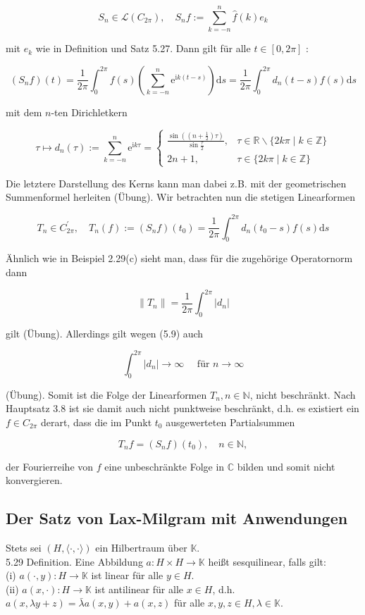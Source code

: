 \documentclass[10pt, letterpaper]{article}
\begin{document}
$$
S_{n} \in \mathcal{L}\left(C_{2 \pi}\right), \quad S_{n} f:=\sum_{k=-n}^{n} \hat{f}(k) e_{k}
$$

mit $e_{k}$ wie in Definition und Satz 5.27. Dann gilt für alle $t \in[0,2 \pi]$ :

$$
\left(S_{n} f\right)(t)=\frac{1}{2 \pi} \int_{0}^{2 \pi} f(s)\left(\sum_{k=-n}^{n} \mathrm{e}^{\mathrm{i} k(t-s)}\right) \mathrm{d} s=\frac{1}{2 \pi} \int_{0}^{2 \pi} d_{n}(t-s) f(s) \mathrm{d} s
$$

mit dem $n$-ten Dirichletkern

$$
\tau \mapsto d_{n}(\tau):=\sum_{k=-n}^{n} \mathrm{e}^{\mathrm{i} k \tau}= \begin{cases}\frac{\sin \left(\left(n+\frac{1}{2}\right) \tau\right)}{\sin \frac{\tau}{2}}, & \tau \in \mathbb{R} \backslash\{2 k \pi \mid k \in \mathbb{Z}\} \\ 2 n+1, & \tau \in\{2 k \pi \mid k \in \mathbb{Z}\}\end{cases}
$$

Die letztere Darstellung des Kerns kann man dabei z.B. mit der geometrischen Summenformel herleiten (Übung). Wir betrachten nun die stetigen Linearformen

$$
T_{n} \in C_{2 \pi}^{\prime}, \quad T_{n}(f):=\left(S_{n} f\right)\left(t_{0}\right)=\frac{1}{2 \pi} \int_{0}^{2 \pi} d_{n}\left(t_{0}-s\right) f(s) \mathrm{d} s
$$

Ähnlich wie in Beispiel 2.29(c) sieht man, dass für die zugehörige Operatornorm dann

$$
\left\|T_{n}\right\|=\frac{1}{2 \pi} \int_{0}^{2 \pi}\left|d_{n}\right|
$$

gilt (Übung). Allerdings gilt wegen (5.9) auch

$$
\int_{0}^{2 \pi}\left|d_{n}\right| \rightarrow \infty \quad \text { für } n \rightarrow \infty
$$

(Übung). Somit ist die Folge der Linearformen $T_{n}, n \in \mathbb{N}$, nicht beschränkt. Nach Hauptsatz 3.8 ist sie damit auch nicht punktweise beschränkt, d.h. es existiert ein $f \in C_{2 \pi}$ derart, dass die im Punkt $t_{0}$ ausgewerteten Partialsummen

$$
T_{n} f=\left(S_{n} f\right)\left(t_{0}\right), \quad n \in \mathbb{N},
$$

der Fourierreihe von $f$ eine unbeschränkte Folge in $\mathbb{C}$ bilden und somit nicht konvergieren.

\subsection*{Der Satz von Lax-Milgram mit Anwendungen}
Stets sei $(H,\langle\cdot, \cdot\rangle)$ ein Hilbertraum über $\mathbb{K}$.\\
5.29 Definition. Eine Abbildung $a: H \times H \rightarrow \mathbb{K}$ heißt sesquilinear, falls gilt:\\
(i) $a(\cdot, y): H \rightarrow \mathbb{K}$ ist linear für alle $y \in H$.\\
(ii) $a(x, \cdot): H \rightarrow \mathbb{K}$ ist antilinear für alle $x \in H$, d.h. $a(x, \lambda y+z)=\bar{\lambda} a(x, y)+a(x, z)$ für alle $x, y, z \in H, \lambda \in \mathbb{K}$.
\end{document}
